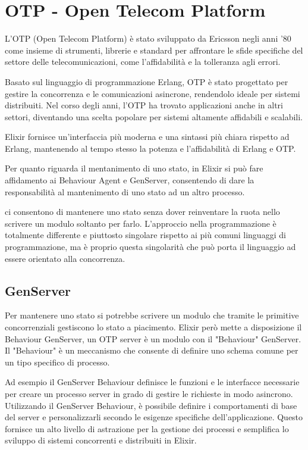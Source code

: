 \section{OTP - Open Telecom Platform}

L'OTP (Open Telecom Platform) è stato sviluppato
da Ericsson negli anni '80 come insieme di strumenti,
librerie e standard per affrontare le sfide specifiche
del settore delle telecomunicazioni,
come l'affidabilità e la tolleranza agli errori.

Basato sul linguaggio di programmazione Erlang,
OTP è stato progettato per gestire la concorrenza
e le comunicazioni asincrone,
rendendolo ideale per sistemi distribuiti.
Nel corso degli anni, l'OTP ha trovato applicazioni
anche in altri settori, diventando una scelta popolare
per sistemi altamente affidabili e scalabili.

Elixir fornisce un'interfaccia più moderna e una sintassi
più chiara rispetto ad Erlang, mantenendo al tempo stesso
la potenza e l'affidabilità di Erlang e OTP.

Per quanto riguarda il mentanimento di uno
stato, in Elixir si può fare affidamento ai Behaviour
Agent e GenServer, consentendo di dare la responsabilità
al mantenimento di uno stato ad un altro processo.

ci consentono di mantenere uno stato senza dover reinventare la
ruota nello scrivere un modulo soltanto per farlo.
L'approccio nella programmazione è totalmente differente
e piuttosto singolare rispetto ai più comuni linguaggi di programmazione,
ma è proprio questa singolarità che può porta il linguaggio
ad essere orientato alla concorrenza. 


\subsection{GenServer}
Per mantenere uno stato si potrebbe scrivere un modulo che
tramite le primitive concorrenziali gestiscono lo stato
a piacimento. Elixir però mette a disposizione il Behaviour
GenServer, un OTP server è un modulo con il
"Behaviour" GenServer.
Il "Behaviour" è un meccanismo che consente di definire
uno schema comune per un tipo specifico di processo.

Ad esempio il GenServer Behaviour definisce le funzioni e
le interfacce necessarie per creare un processo server in grado
di gestire le richieste in modo asincrono.
Utilizzando il GenServer Behaviour, è possibile definire i comportamenti
di base del server e personalizzarli secondo le esigenze specifiche
dell'applicazione. 
Questo fornisce un alto livello di astrazione per la gestione
dei processi e semplifica lo sviluppo di sistemi concorrenti e
distribuiti in Elixir.

